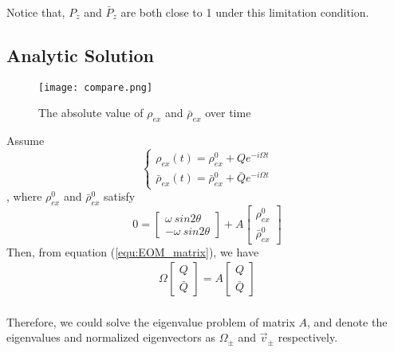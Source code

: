 \documentclass[aps,prd,twocolumn,amsmath,amssymb,groupedaddress]{revtex4-2}
\begin{document}
Notice that, $P_{z}$ and $\bar{P}_{z}$ are both close to 1 under this limitation condition.

\subsection{\label{subsec:analytic} Analytic Solution}
\begin{figure}[b]
	\texttt{[image: compare.png]}
	\caption{\label{fig:compare} The absolute value of $\rho_{ex}$ and $\bar{\rho}_{ex}$ over time}
\end{figure}

Assume
\begin{equation}
	\begin{cases}
		\rho_{ex}(t) = \rho^0_{ex} + Q e^{-i\Omega t}
		\\
		\bar{\rho}_{ex}(t) = \bar{\rho}^0_{ex} + \bar{Q} e^{-i\Omega t}
	\end{cases}
\end{equation}
, where $\rho^0_{ex}$ and $\bar{\rho}^0_{ex}$ satisfy
\begin{equation}
	\label{equ:rho0}
	0= \begin{bmatrix}
		\omega ~sin2\theta \\ - \omega ~sin2\theta
	\end{bmatrix}  + 
	A \begin{bmatrix} \rho^0_{ex} \\ \bar{\rho}^0_{ex}
	\end{bmatrix}
\end{equation}
Then, from equation (\ref{equ:EOM_matrix}), we have
\begin{eqnarray}
	\label{equ:eigenfunction}
	\Omega 
	\begin{bmatrix}
		Q \\ \bar{Q}
	\end{bmatrix}
	= A
	\begin{bmatrix}
		Q \\ \bar{Q}
	\end{bmatrix}
\end{eqnarray}
~\\
Therefore, we could solve the eigenvalue problem of matrix $A$, and denote the eigenvalues and normalized eigenvectors as $\Omega_\pm$ and $\vec{v}_\pm$ respectively.
\end{document}
